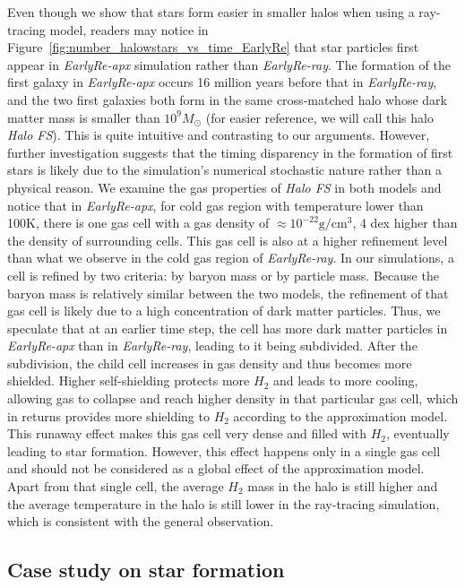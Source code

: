 \documentclass[linenumbers, twocolumn]{aastex631}
\begin{document}
Even though we show that stars form easier in smaller halos when using a ray-tracing model, readers may notice in Figure~\ref{fig:number_halowstars_vs_time_EarlyRe} that star particles first appear in \textit{EarlyRe-apx} simulation rather than \textit{EarlyRe-ray}. The formation of the first galaxy in \textit{EarlyRe-apx} occurs 16 million years before that in \textit{EarlyRe-ray}, and the two first galaxies both form in the same cross-matched halo whose dark matter mass is smaller than $10^{9} M_\odot$ (for easier reference, we will call this halo \textit{Halo FS}). This is quite intuitive and contrasting to our arguments. However, further investigation suggests that the timing disparency in the formation of first stars is likely due to the simulation's numerical stochastic nature rather than a physical reason. We examine the gas properties of \textit{Halo FS} in both models and notice that in \textit{EarlyRe-apx}, for cold gas region with temperature lower than 100K, there is one gas cell with a gas density of $\approx 10^{-22} \mathrm{g}/\mathrm{cm}^{3}$, 4 dex higher than the density of surrounding cells. This gas cell is also at a higher refinement level than what we observe in the cold gas region of \textit{EarlyRe-ray}. In our simulations, a cell is refined by two criteria: by baryon mass or by particle mass. Because the baryon mass is relatively similar between the two models, the refinement of that gas cell is likely due to a high concentration of dark matter particles. Thus, we speculate that at an earlier time step, the cell has more dark matter particles in \textit{EarlyRe-apx} than in \textit{EarlyRe-ray}, leading to it being subdivided. After the subdivision, the child cell increases in gas density and thus becomes more shielded. Higher self-shielding protects more $H_{2}$ and leads to more cooling, allowing gas to collapse and reach higher density in that particular gas cell, which in returns provides more shielding to $H_{2}$ according to the approximation model. This runaway effect makes this gas cell very dense and filled with $H_{2}$, eventually leading to star formation. However, this effect happens only in a single gas cell and should not be considered as a global effect of the approximation model. Apart from that single cell, the average $H_{2}$ mass in the halo is still higher and the average temperature in the halo is still lower in the ray-tracing simulation, which is consistent with the general observation. 


\subsection{Case study on star formation}
\label{subsect:case_study}
\end{document}
